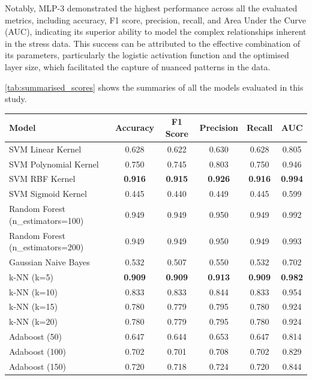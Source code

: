     Notably, MLP-3 demonstrated the highest performance across all the evaluated metrics, including accuracy, F1 score, precision, recall, and Area Under the Curve (AUC), indicating its superior ability to model the complex relationships inherent in the stress data. This success can be attributed to the effective combination of its parameters, particularly the logistic activation function and the optimised layer size, which facilitated the capture of nuanced patterns in the data.


    \autoref*{tab:summarised_scores} shows the summaries of all the models evaluated in this study.

    \begin{table}[H]
        \centering
        
        \begin{tabular}{|p{5cm}|c|c|c|c|c|}
        \hline
        \textbf{Model} & \textbf{Accuracy} & \textbf{F1 Score} & \textbf{Precision} & \textbf{Recall} & \textbf{AUC} \\ \hline
        SVM Linear Kernel & 0.628 & 0.622 & 0.630 & 0.628 & 0.805 \\
        SVM Polynomial Kernel & 0.750 & 0.745 & 0.803 & 0.750 & 0.946 \\
        SVM RBF Kernel & \textbf{0.916} & \textbf{0.915} & \textbf{0.926} & \textbf{0.916} & \textbf{0.994} \\
        SVM Sigmoid Kernel & 0.445 & 0.440 & 0.449 & 0.445 & 0.599 \\
        Random Forest (n\_estimators=100) & 0.949 & 0.949 & 0.950 & 0.949 & 0.992 \\
        Random Forest (n\_estimators=200) & 0.949 & 0.949 & 0.950 & 0.949 & 0.993 \\
        Gaussian Naive Bayes & 0.532 & 0.507 & 0.550 & 0.532 & 0.702 \\
        k-NN (k=5) & \textbf{0.909} & \textbf{0.909} & \textbf{0.913} & \textbf{0.909} & \textbf{0.982} \\
        k-NN (k=10) & 0.833 & 0.833 & 0.844 & 0.833 & 0.954 \\
        k-NN (k=15) & 0.780 & 0.779 & 0.795 & 0.780 & 0.924 \\
        k-NN (k=20) & 0.780 & 0.779 & 0.795 & 0.780 & 0.924 \\
        Adaboost (50) & 0.647 & 0.644 & 0.653 & 0.647 & 0.814 \\
        Adaboost (100) & 0.702 & 0.701 & 0.708 & 0.702 & 0.829 \\
        Adaboost (150) & 0.720 & 0.718 & 0.724 & 0.720 & 0.844 \\

\end{tabular}
\end{table}
